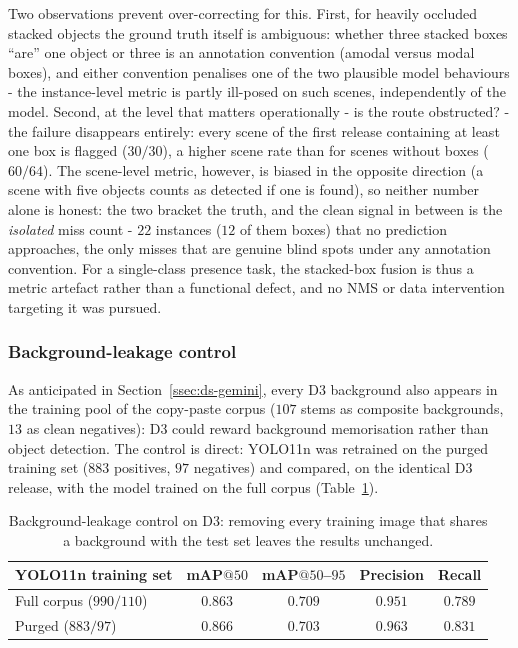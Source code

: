 Two observations prevent over-correcting for this. First, for heavily occluded
stacked objects the ground truth itself is ambiguous: whether three stacked
boxes ``are'' one object or three is an annotation convention (amodal versus
modal boxes), and either convention penalises one of the two plausible model
behaviours - the instance-level metric is partly ill-posed on such scenes,
independently of the model. Second, at the level that matters operationally -
is the route obstructed? - the failure disappears entirely: every scene of the
first release containing at least one box is flagged ($30/30$), a higher scene
rate than for scenes without boxes ($60/64$). The scene-level metric, however,
is biased in the opposite direction (a scene with five objects counts as
detected if one is found), so neither number alone is honest: the two bracket
the truth, and the clean signal in between is the \emph{isolated} miss count -
$22$ instances ($12$ of them boxes) that no prediction approaches, the only
misses that are genuine blind spots under any annotation convention. For a
single-class presence task, the stacked-box fusion is thus a metric artefact
rather than a functional defect, and no NMS or data intervention targeting it
was pursued.

\subsubsection{Background-leakage control}

As anticipated in Section~\ref{ssec:ds-gemini}, every D3 background also
appears in the training pool of the copy-paste corpus ($107$ stems as
composite backgrounds, $13$ as clean negatives): D3 could reward background
memorisation rather than object detection. The control is direct: YOLO11n was
retrained on the purged training set ($883$ positives, $97$ negatives) and
compared, on the identical D3 release, with the model trained on the full
corpus (Table~\ref{tab:p1-leak}).

\begin{table}[h]
  \centering
  \begin{tabular}{lcccc}
    \hline
    YOLO11n training set & mAP$@50$ & mAP$@50$--$95$ & Precision & Recall \\
    \hline
    Full corpus ($990/110$) & $0.863$ & $0.709$ & $0.951$ & $0.789$ \\
    Purged ($883/97$) & $0.866$ & $0.703$ & $0.963$ & $0.831$ \\
    \hline
  \end{tabular}
  \caption{Background-leakage control on D3: removing every training image that
  shares a background with the test set leaves the results unchanged.}
  \label{tab:p1-leak}
\end{table}

